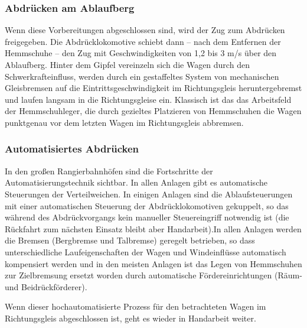\subsubsection{Abdrücken am Ablaufberg}\label{sec:Abdruecken}
Wenn diese Vorbereitungen abgeschlossen sind, wird der Zug zum Abdrücken freigegeben. Die Abdrücklokomotive schiebt dann -- nach dem Entfernen der Hemmschuhe -- den Zug mit Geschwindigkeiten von 1,2 bis 3 m/s %
über den Ablaufberg. Hinter dem Gipfel vereinzeln sich die Wagen durch den Schwerkrafteinfluss, werden durch ein gestaffeltes System von mechanischen Gleisbremsen auf die Eintrittsgeschwindigkeit im Richtungsgleis heruntergebremst und laufen langsam in die Richtungsgleise ein.  Klassisch ist das das Arbeitsfeld der Hemmschuhleger, die durch gezieltes Platzieren von Hemmschuhen die Wagen punktgenau vor dem letzten Wagen im Richtungsgleis abbremsen.
\subsubsection{Automatisiertes Abdrücken}\label{sec:automAbdruecken}
In den großen Rangierbahnhöfen sind die Fortschritte der Automatisierungstechnik sichtbar. In allen Anlagen gibt es automatische Steuerungen der Verteilweichen. In einigen Anlagen sind die Ablaufsteuerungen mit einer automatischen Steuerung der Abdrücklokomotiven gekuppelt, so das während des Abdrückvorgangs kein manueller Steuereingriff notwendig ist (die Rückfahrt zum nächsten Einsatz bleibt aber Handarbeit).In allen Anlagen werden die Bremsen (Bergbremse und Talbremse) geregelt betrieben, so dass unterschiedliche Laufeigenschaften der Wagen und Windeinflüsse automatisch kompensiert werden und in den meisten Anlagen ist das Legen von Hemmschuhen zur Zielbremsung ersetzt worden durch automatische Fördereinrichtungen (Räum- und Beidrückförderer).\par
Wenn dieser hochautomatisierte Prozess für den betrachteten Wagen im Richtungsgleis abgeschlossen ist, geht es wieder in Handarbeit weiter.
